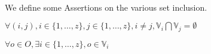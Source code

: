 \paragraph{}
We define some Assertions on the various set inclusion.
\begin{assertion}
$\forall (i, j), i \in \{1, \hdots, z \}, j \in \{ 1, \hdots, z \}, i \neq j, \mathbb{V}_i \bigcap \mathbb{V}_j = \emptyset $
\end{assertion}
\begin{assertion}
$\forall o \in O, \exists i \in \{ 1, \hdots, z \}, o \in \mathbb{V}_i$
\end{assertion}



